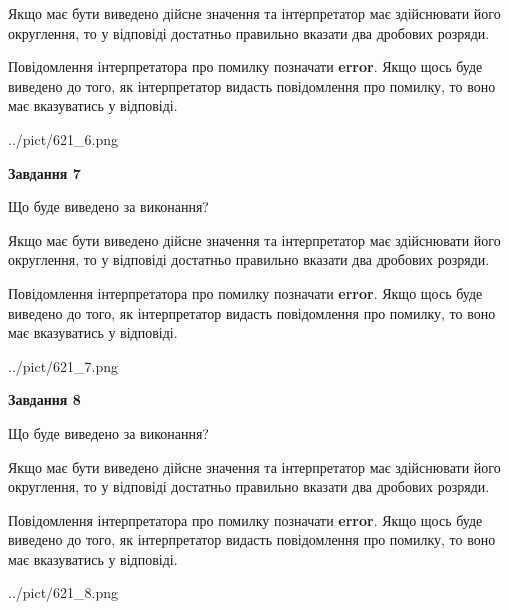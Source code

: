 \documentclass[12pt, ukrainian]{article}
\begin{document}
{\begin {Large}
Якщо має бути виведено дійсне значення та інтерпретатор має здійснювати його округлення, 
то у відповіді достатньо правильно вказати два дробових розряди.

Повідомлення інтерпретатора про помилку позначати \textbf{error}.
Якщо щось буде виведено до того, як інтерпретатор видасть повідомлення про помилку, 
то воно має вказуватись у відповіді. \par

\begin{center}
	{../pict/621_6.png}
\end{center}
\newpage

{\begin {center}\textbf{Завдання 7}\end {center}}\par
Що буде виведено за виконання? \par

Якщо має бути виведено дійсне значення та інтерпретатор має здійснювати його округлення, 
то у відповіді достатньо правильно вказати два дробових розряди.

Повідомлення інтерпретатора про помилку позначати \textbf{error}.
Якщо щось буде виведено до того, як інтерпретатор видасть повідомлення про помилку, 
то воно має вказуватись у відповіді. \par

\begin{center}
	{../pict/621_7.png}
\end{center}
\newpage

{\begin {center}\textbf{Завдання 8}\end {center}}\par
Що буде виведено за виконання? \par

Якщо має бути виведено дійсне значення та інтерпретатор має здійснювати його округлення, 
то у відповіді достатньо правильно вказати два дробових розряди.

Повідомлення інтерпретатора про помилку позначати \textbf{error}.
Якщо щось буде виведено до того, як інтерпретатор видасть повідомлення про помилку, 
то воно має вказуватись у відповіді. \par

\begin{center}
	{../pict/621_8.png}
\end{center}
\newpage


\end{Large}}
\end{document}
